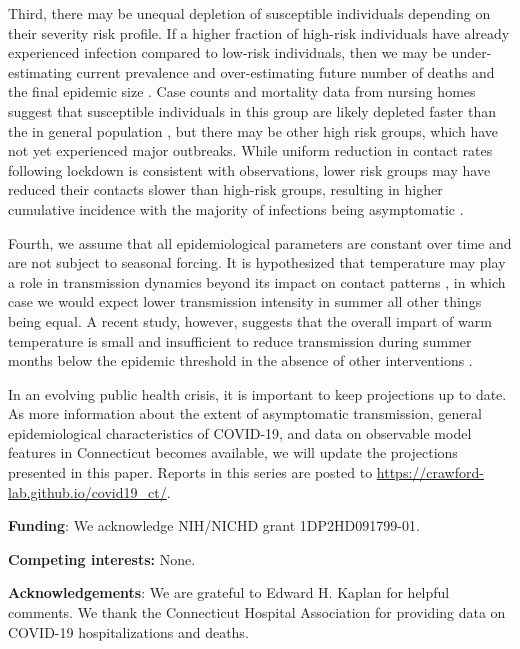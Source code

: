 \documentclass[11pt]{article}
\begin{document}
Third, there may be unequal depletion of susceptible individuals depending on their severity risk profile. If a higher fraction of high-risk individuals have already experienced infection compared to low-risk individuals, then we may be under-estimating current prevalence and over-estimating future number of deaths and the final epidemic size \citep{gomes2020individual, britton2020disease}. Case counts and mortality data from nursing homes suggest that susceptible individuals in this group are likely depleted faster than the in general population \citep{DPHwebsitenursing}, but there may be other high risk groups, which have not yet experienced major outbreaks. While uniform reduction in contact rates following lockdown is consistent with observations, lower risk groups may have reduced their contacts slower than high-risk groups, resulting in higher cumulative incidence with the majority of infections being asymptomatic \citep{campbell2020prevalence}.

Fourth, we assume that all epidemiological parameters are constant over time and are not subject to seasonal forcing. It is hypothesized that temperature may play a role in transmission dynamics beyond its impact on contact patterns \citep{kissler2020projecting}, in which case we would expect lower transmission intensity in summer all other things being equal. A recent study, however, suggests that the overall impart of warm temperature is small and insufficient to reduce transmission during summer months below the epidemic threshold in the absence of other interventions \citep{xu2020modest}.

In an evolving public health crisis, it is important to keep projections up to date. As more information about the extent of asymptomatic transmission, general epidemiological characteristics of COVID-19, and data on observable model features in Connecticut becomes available, we will update the projections presented in this paper. Reports in this series are posted to \url{https://crawford-lab.github.io/covid19_ct/}. 





\textbf{Funding}: We acknowledge NIH/NICHD grant 1DP2HD091799-01. 


\textbf{Competing interests:} None.



\textbf{Acknowledgements}: We are grateful to Edward H. Kaplan for helpful comments. We thank the Connecticut Hospital Association for providing data on COVID-19 hospitalizations and deaths. 





\end{document}
